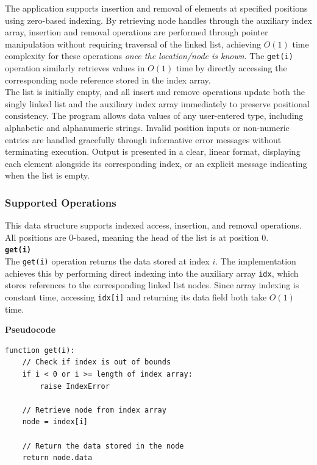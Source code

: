 \documentclass[12pt]{article}
\begin{document}
The application supports insertion and removal of elements at specified positions using zero-based indexing. By retrieving node handles through the auxiliary index array, insertion and removal operations are performed through pointer manipulation without requiring traversal of the linked list, achieving $O(1)$ time complexity for these operations \emph{once the location/node is known}\parencite{Rowell_BigOCheatSheet,GeeksforGeeks_SinglyLinkedListTutorial_2026}. The \texttt{get(i)} operation similarly retrieves values in $O(1)$ time by directly accessing the corresponding node reference stored in the index array\parencite{Rowell_BigOCheatSheet}. \\

The list is initially empty, and all insert and remove operations update both the singly linked list and the auxiliary index array immediately to preserve positional consistency. The program allows data values of any user-entered type, including alphabetic and alphanumeric strings. Invalid position inputs or non-numeric entries are handled gracefully through informative error messages without terminating execution. Output is presented in a clear, linear format, displaying each element alongside its corresponding index, or an explicit message indicating when the list is empty.

\newpage
\subsubsection{Supported Operations}
This data structure supports indexed access, insertion, and removal operations. All positions are 0-based, meaning the head of the list is at position 0.\\

\noindent\textbf{\texttt{get(i)}}\\

The \texttt{get(i)} operation returns the data stored at index $i$. The implementation achieves this by performing direct indexing into the auxiliary array \texttt{idx}, which stores references to the corresponding linked list nodes. Since array indexing is constant time, accessing \texttt{idx[i]} and returning its data field both take $O(1)$ time\parencite{Rowell_BigOCheatSheet}.

\textbf{Pseudocode}

\begin{lstlisting}
function get(i):
    // Check if index is out of bounds
    if i < 0 or i >= length of index array:
        raise IndexError

    // Retrieve node from index array
    node = index[i]

    // Return the data stored in the node
    return node.data
\end{lstlisting}
\end{document}
